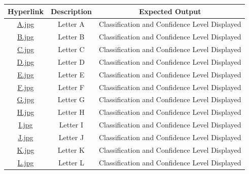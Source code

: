 \documentclass[12pt, titlepage]{article}
\begin{document}
\begin{table}[h!]
  \centering
  \begin{tabular}{|c|c|c|}
    \hline
    \textbf{Hyperlink} & \textbf{Description} & \textbf{Expected Output} \\ \hline
    \href{https://github.com/cer-hunter/OAR-CAS741/tree/main/tests/test-images/A.jpg}{A.jpg} & Letter A & Classification and Confidence Level Displayed\\ \hline
    \href{https://github.com/cer-hunter/OAR-CAS741/tree/main/tests/test-images/B.jpg}{B.jpg} & Letter B & Classification and Confidence Level Displayed\\ \hline
    \href{https://github.com/cer-hunter/OAR-CAS741/tree/main/tests/test-images/C.jpg}{C.jpg} & Letter C & Classification and Confidence Level Displayed\\ \hline
    \href{https://github.com/cer-hunter/OAR-CAS741/tree/main/tests/test-images/D.jpg}{D.jpg} & Letter D & Classification and Confidence Level Displayed\\ \hline
    \href{https://github.com/cer-hunter/OAR-CAS741/tree/main/tests/test-images/E.jpg}{E.jpg} & Letter E & Classification and Confidence Level Displayed\\ \hline
    \href{https://github.com/cer-hunter/OAR-CAS741/tree/main/tests/test-images/F.jpg}{F.jpg} & Letter F & Classification and Confidence Level Displayed\\ \hline
    \href{https://github.com/cer-hunter/OAR-CAS741/tree/main/tests/test-images/G.jpg}{G.jpg} & Letter G & Classification and Confidence Level Displayed\\ \hline
    \href{https://github.com/cer-hunter/OAR-CAS741/tree/main/tests/test-images/H.jpg}{H.jpg} & Letter H & Classification and Confidence Level Displayed\\ \hline
    \href{https://github.com/cer-hunter/OAR-CAS741/tree/main/tests/test-images/I.jpg}{I.jpg} & Letter I & Classification and Confidence Level Displayed\\ \hline
    \href{https://github.com/cer-hunter/OAR-CAS741/tree/main/tests/test-images/J.jpg}{J.jpg} & Letter J & Classification and Confidence Level Displayed\\ \hline
    \href{https://github.com/cer-hunter/OAR-CAS741/tree/main/tests/test-images/K.jpg}{K.jpg} & Letter K & Classification and Confidence Level Displayed\\ \hline
    \href{https://github.com/cer-hunter/OAR-CAS741/tree/main/tests/test-images/L.jpg}{L.jpg} & Letter L & Classification and Confidence Level Displayed\\ \hline

\end{tabular}
\end{table}
\end{document}
